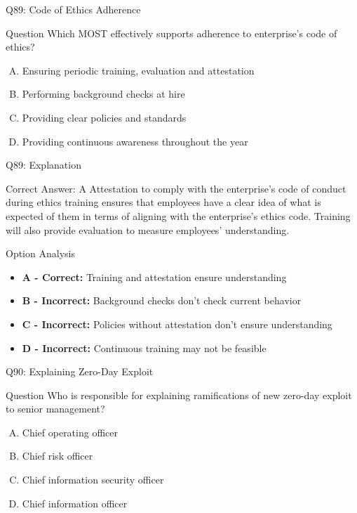 \documentclass{beamer}
\begin{document}
	\begin{frame}{Q89: Code of Ethics Adherence}
		\begin{block}{Question}
			Which MOST effectively supports adherence to enterprise's code of ethics?
		\end{block}
		\begin{enumerate}[(A)]
			\item Ensuring periodic training, evaluation and attestation
			\item Performing background checks at hire
			\item Providing clear policies and standards
			\item Providing continuous awareness throughout the year
		\end{enumerate}
	\end{frame}
	
	\begin{frame}{Q89: Explanation}
		\begin{block}{Correct Answer: A}
			Attestation to comply with the enterprise's code of conduct during ethics training ensures that employees have a clear idea of what is expected of them in terms of aligning with the enterprise's ethics code. Training will also provide evaluation to measure employees' understanding.
		\end{block}
		\begin{block}{Option Analysis}
			\begin{itemize}
				\item \textbf{A - Correct:} Training and attestation ensure understanding
				\item \textbf{B - Incorrect:} Background checks don't check current behavior
				\item \textbf{C - Incorrect:} Policies without attestation don't ensure understanding
				\item \textbf{D - Incorrect:} Continuous training may not be feasible
			\end{itemize}
		\end{block}
	\end{frame}
	
	\begin{frame}{Q90: Explaining Zero-Day Exploit}
		\begin{block}{Question}
			Who is responsible for explaining ramifications of new zero-day exploit to senior management?
		\end{block}
		\begin{enumerate}[(A)]
			\item Chief operating officer
			\item Chief risk officer
			\item Chief information security officer
			\item Chief information officer
		\end{enumerate}
	\end{frame}
	
\end{document}
